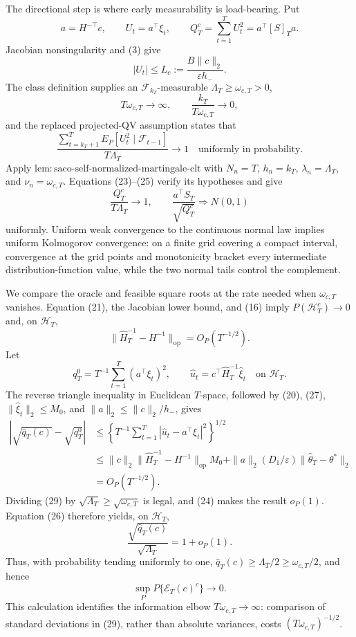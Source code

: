 The directional step is where early measurability is load-bearing. Put
\[
 a=H^{-\top}c,\qquad U_t=a^\top\xi_t,\qquad
 Q_T^c=\sum_{t=1}^TU_t^2=a^\top[S]_Ta.
\tag{22}
\]
Jacobian nonsingularity and (3) give
\[
 |U_t|\le L_c:=\frac{B\|c\|_2}{\varepsilon h_-}.
\tag{23}
\]
The class definition supplies an \(\mathcal F_{k_T}\)-measurable \(\Lambda_T\ge\omega_{c,T}>0\),
\[
 T\omega_{c,T}\longrightarrow\infty,
 \qquad \frac{k_T}{T\omega_{c,T}}\longrightarrow0,
\tag{24}
\]
and the replaced projected-QV assumption states that
\[
 \frac{\sum_{t=k_T+1}^TE_P[U_t^2\mid\mathcal F_{t-1}]}
 {T\Lambda_T}\longrightarrow1
 \quad\text{uniformly in probability}.
\tag{25}
\]
Apply \(\mathrm{lem:saco\text{-}self\text{-}normalized\text{-}martingale\text{-}clt}\) with \(N_n=T\), \(h_n=k_T\), \(\lambda_n=\Lambda_T\), and \(\nu_n=\omega_{c,T}\). Equations (23)--(25) verify its hypotheses and give
\[
 \frac{Q_T^c}{T\Lambda_T}\longrightarrow1,
 \qquad \frac{a^\top S_T}{\sqrt{Q_T^c}}\Rightarrow N(0,1)
\tag{26}
\]
uniformly. Uniform weak convergence to the continuous normal law implies uniform Kolmogorov convergence: on a finite grid covering a compact interval, convergence at the grid points and monotonicity bracket every intermediate distribution-function value, while the two normal tails control the complement.

We compare the oracle and feasible square roots at the rate needed when \(\omega_{c,T}\) vanishes. Equation (21), the Jacobian lower bound, and (16) imply \(P(\mathcal H_T^c)\to0\) and, on \(\mathcal H_T\),
\[
 \|\widehat H_T^{-1}-H^{-1}\|_{\mathrm{op}}=O_P(T^{-1/2}).
\tag{27}
\]
Let
\[
 q_T^0=T^{-1}\sum_{t=1}^T(a^\top\xi_t)^2,
 \qquad \widehat u_t=c^\top\widehat H_T^{-1}\widehat\xi_t
 \quad\text{on }\mathcal H_T.
\tag{28}
\]
The reverse triangle inequality in Euclidean \(T\)-space, followed by (20), (27), \(\|\widehat\xi_t\|_2\le M_0\), and \(\|a\|_2\le\|c\|_2/h_-\), gives
\[
 \begin{aligned}
 \left|\sqrt{\widehat q_T(c)}-\sqrt{q_T^0}\right|
 &\le\left\{T^{-1}\sum_{t=1}^T
 |\widehat u_t-a^\top\xi_t|^2\right\}^{1/2}\\
 &\le \|c\|_2\|\widehat H_T^{-1}-H^{-1}\|_{\mathrm{op}}M_0
 +\|a\|_2(D_1/\varepsilon)\|\widehat\theta_T-\theta^*\|_2\\
 &=O_P(T^{-1/2}).
 \end{aligned}
\tag{29}
\]
Dividing (29) by \(\sqrt{\Lambda_T}\ge\sqrt{\omega_{c,T}}\) is legal, and (24) makes the result \(o_P(1)\). Equation (26) therefore yields, on \(\mathcal H_T\),
\[
 \frac{\sqrt{\widehat q_T(c)}}{\sqrt{\Lambda_T}}=1+o_P(1).
\tag{30}
\]
Thus, with probability tending uniformly to one, \(\widehat q_T(c)\ge\Lambda_T/2\ge\omega_{c,T}/2\), and hence
\[
 \sup_P P\{\mathcal E_T(c)^c\}\longrightarrow0.
\tag{31}
\]
This calculation identifies the information elbow \(T\omega_{c,T}\to\infty\): comparison of standard deviations in (29), rather than absolute variances, costs \((T\omega_{c,T})^{-1/2}\).

